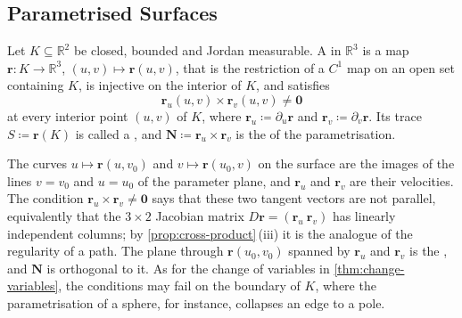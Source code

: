 \subsection{Parametrised Surfaces}

\begin{definition}
\label{def:parametrised-surface}
Let $K\subseteq\mathbb R^2$ be closed, bounded and Jordan measurable. A  in $\mathbb R^3$ is a map $\mathbf r\colon K\to\mathbb R^3$, $(u,v)\mapsto\mathbf r(u,v)$, that is the restriction of a $C^1$ map on an open set containing $K$, is injective on the interior of $K$, and satisfies
\[
\mathbf r_u(u,v)\times\mathbf r_v(u,v)\ne\mathbf0
\]
at every interior point $(u,v)$ of $K$, where $\mathbf r_u\coloneqq\partial_u\mathbf r$ and $\mathbf r_v\coloneqq\partial_v\mathbf r$. Its trace $S\coloneqq\mathbf r(K)$ is called a , and $\mathbf N\coloneqq\mathbf r_u\times\mathbf r_v$ is the  of the parametrisation.
\end{definition}

The curves $u\mapsto\mathbf r(u,v_0)$ and $v\mapsto\mathbf r(u_0,v)$ on the surface are the images of the lines $v=v_0$ and $u=u_0$ of the parameter plane, and $\mathbf r_u$ and $\mathbf r_v$ are their velocities. The condition $\mathbf r_u\times\mathbf r_v\ne\mathbf0$ says that these two tangent vectors are not parallel, equivalently that the $3\times2$ Jacobian matrix $D\mathbf r=(\mathbf r_u\ \mathbf r_v)$ has linearly independent columns; by \cref{prop:cross-product}\,(iii) it is the analogue of the regularity of a path. The plane through $\mathbf r(u_0,v_0)$ spanned by $\mathbf r_u$ and $\mathbf r_v$ is the , and $\mathbf N$ is orthogonal to it. As for the change of variables in \cref{thm:change-variables}, the conditions may fail on the boundary of $K$, where the parametrisation of a sphere, for instance, collapses an edge to a pole.

